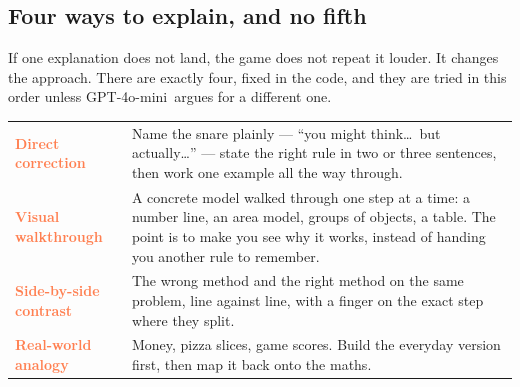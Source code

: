 \documentclass[11pt]{article}
\newcommand{\themodel}{GPT-4o-mini}
\begin{document}
\vspace{0.5em}
\begin{center}
\begin{adjustbox}{max width=\textwidth}
\end{adjustbox}
\end{center}

\subsection{Four ways to explain, and no fifth}

If one explanation does not land, the game does not repeat it louder. It
changes the approach. There are exactly four, fixed in the code, and they are
tried in this order unless \themodel\ argues for a different one.

\vspace{0.3em}
\begin{center}
\begin{tabularx}{0.97\textwidth}{@{}>{\sffamily\bfseries}L{34mm} X@{}}
\toprule
\textcolor{Coral}{Direct correction} & Name the snare plainly --- ``you might think\ldots\ but
actually\ldots'' --- state the right rule in two or three sentences, then work
one example all the way through.\\
\addlinespace[0.3em]
\textcolor{Coral}{Visual walkthrough} & A concrete model walked through one step at a time: a
number line, an area model, groups of objects, a table. The point is to make you
see why it works, instead of handing you another rule to remember.\\
\addlinespace[0.3em]
\textcolor{Coral}{Side-by-side contrast} & The wrong method and the right method on the same
problem, line against line, with a finger on the exact step where they split.\\
\addlinespace[0.3em]
\textcolor{Coral}{Real-world analogy} & Money, pizza slices, game scores. Build the everyday
version first, then map it back onto the maths.\\
\bottomrule
\end{tabularx}
\end{center}
\end{document}
